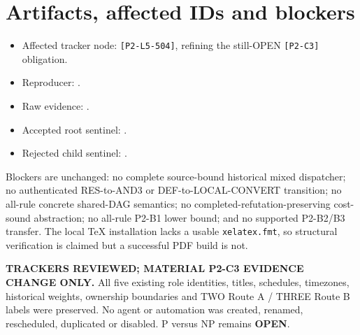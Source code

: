 \documentclass[11pt]{article}
\begin{document}
\section*{Artifacts, affected IDs and blockers}
\begin{itemize}
\item Affected tracker node: \texttt{[P2-L5-504]}, refining the still-OPEN \texttt{[P2-C3]} obligation.
\item Reproducer: .
\item Raw evidence: .
\item Accepted root sentinel: .
\item Rejected child sentinel: .
\end{itemize}

Blockers are unchanged: no complete source-bound historical mixed dispatcher; no authenticated RES-to-AND3 or DEF-to-LOCAL-CONVERT transition; no all-rule concrete shared-DAG semantics; no completed-refutation-preserving cost-sound abstraction; no all-rule P2-B1 lower bound; and no supported P2-B2/B3 transfer.  The local TeX installation lacks a usable \texttt{xelatex.fmt}, so structural verification is claimed but a successful PDF build is not.

\textbf{TRACKERS REVIEWED; MATERIAL P2-C3 EVIDENCE CHANGE ONLY.}
All five existing role identities, titles, schedules, timezones, historical weights, ownership boundaries and TWO Route A / THREE Route B labels were preserved.  No agent or automation was created, renamed, rescheduled, duplicated or disabled.  P versus NP remains \textbf{OPEN}.
\end{document}
